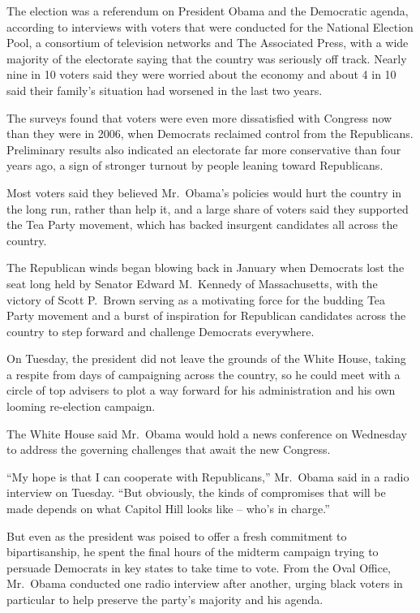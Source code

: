 ﻿\documentclass[12pt]{article}
\begin{document}
The election was a referendum on President Obama and the Democratic agenda, according to interviews
with voters that were conducted for the National Election Pool, a consortium of television networks
and The Associated Press, with a wide majority of the electorate saying that the country was
seriously off track. Nearly nine in 10 voters said they were worried about the economy and about 4
in 10 said their family's situation had worsened in the last two years.

The surveys found that voters were even more dissatisfied with Congress now than they were in 2006,
when Democrats reclaimed control from the Republicans. Preliminary results also indicated an
electorate far more conservative than four years ago, a sign of stronger turnout by people leaning
toward Republicans.

Most voters said they believed Mr.~Obama's policies would hurt the country in the long run, rather
than help it, and a large share of voters said they supported the Tea Party movement, which has
backed insurgent candidates all across the country.

The Republican winds began blowing back in January when Democrats lost the seat long held by Senator
Edward M.~Kennedy of Massachusetts, with the victory of Scott P.~Brown serving as a motivating force
for the budding Tea Party movement and a burst of inspiration for Republican candidates across the
country to step forward and challenge Democrats everywhere.

On Tuesday, the president did not leave the grounds of the White House, taking a respite from days
of campaigning across the country, so he could meet with a circle of top advisers to plot a way
forward for his administration and his own looming re-election campaign.

The White House said Mr.~Obama would hold a news conference on Wednesday to address the governing
challenges that await the new Congress.

``My hope is that I can cooperate with Republicans,'' Mr.~Obama said in a radio interview on
Tuesday. ``But obviously, the kinds of compromises that will be made depends on what Capitol Hill
looks like -- who's in charge.''

But even as the president was poised to offer a fresh commitment to bipartisanship, he spent the
final hours of the midterm campaign trying to persuade Democrats in key states to take time to vote.
From the Oval Office, Mr.~Obama conducted one radio interview after another, urging black voters in
particular to help preserve the party's majority and his agenda.
\end{document}
